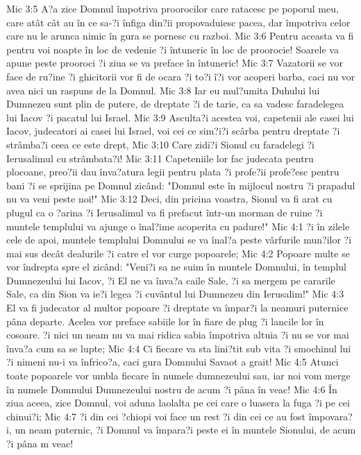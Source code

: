 Mic 3:5  A?a zice Domnul împotriva proorocilor care ratacesc pe poporul meu, care atât cât au în ce sa-?i înfiga din?ii propovaduiesc pacea, dar împotriva celor care nu le arunca nimic în gura se pornesc cu razboi.
Mic 3:6  Pentru aceasta va fi pentru voi noapte în loc de vedenie ?i întuneric în loc de proorocie! Soarele va apune peste prooroci ?i ziua se va preface în întuneric!
Mic 3:7  Vazatorii se vor face de ru?ine ?i ghicitorii vor fi de ocara ?i to?i î?i vor acoperi barba, caci nu vor avea nici un raspuns de la Domnul.
Mic 3:8  Iar eu mul?umita Duhului lui Dumnezeu sunt plin de putere, de dreptate ?i de tarie, ca sa vadesc faradelegea lui Iacov ?i pacatul lui Israel.
Mic 3:9  Asculta?i acestea voi, capetenii ale casei lui Iacov, judecatori ai casei lui Israel, voi cei ce sim?i?i scârba pentru dreptate ?i strâmba?i ceea ce este drept,
Mic 3:10  Care zidi?i Sionul cu faradelegi ?i Ierusalimul cu strâmbata?i!
Mic 3:11  Capeteniile lor fac judecata pentru plocoane, preo?ii dau înva?atura legii pentru plata ?i profe?ii profe?esc pentru bani ?i se sprijina pe Domnul zicând: "Domnul este în mijlocul nostru ?i prapadul nu va veni peste noi!"
Mic 3:12  Deci, din pricina voastra, Sionul va fi arat cu plugul ca o ?arina ?i Ierusalimul va fi prefacut într-un morman de ruine ?i muntele templului va ajunge o înal?ime acoperita cu padure!"
Mic 4:1  ?i în zilele cele de apoi, muntele templului Domnului se va înal?a peste vârfurile mun?ilor ?i mai sus decât dealurile ?i catre el vor curge popoarele;
Mic 4:2  Popoare multe se vor îndrepta spre el zicând: "Veni?i sa ne suim în muntele Domnului, în templul Dumnezeului lui Iacov, ?i El ne va înva?a caile Sale, ?i sa mergem pe cararile Sale, ca din Sion va ie?i legea ?i cuvântul lui Dumnezeu din Ierusalim!"
Mic 4:3  El va fi judecator al multor popoare ?i dreptate va împar?i la neamuri puternice pâna departe. Acelea vor preface sabiile lor în fiare de plug ?i lancile lor în cosoare. ?i nici un neam nu va mai ridica sabia împotriva altuia ?i nu se vor mai înva?a cum sa se lupte;
Mic 4:4  Ci fiecare va sta lini?tit sub vita ?i smochinul lui ?i nimeni nu-i va înfrico?a, caci gura Domnului Savaot a grait!
Mic 4:5  Atunci toate popoarele vor umbla fiecare în numele dumnezeului sau, iar noi vom merge în numele Domnului Dumnezeului nostru de acum ?i pâna în veac!
Mic 4:6  În ziua aceea, zice Domnul, voi aduna laolalta pe cei care o luasera la fuga ?i pe cei chinui?i;
Mic 4:7  ?i din cei ?chiopi voi face un rest ?i din cei ce au fost împovara?i, un neam puternic, ?i Domnul va împara?i peste ei în muntele Sionului, de acum ?i pâna m veac!
